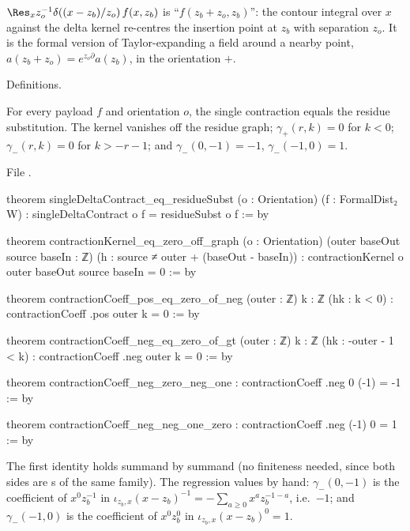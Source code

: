 \begin{physics}
$\Res_x z_o^{-1}\delta((x-z_b)/z_o)\,f(x,z_b)$ is ``$f(z_b+z_o,z_b)$'': the contour integral over $x$ against the delta kernel
re-centres the insertion point at $z_b$ with separation $z_o$. It is the formal version of Taylor-expanding a field
around a nearby point, $a(z_b+z_o) = e^{z_o\partial}a(z_b)$, in the orientation $+$.
\end{physics}

\begin{status}
Definitions.
\end{status}

\begin{proposition}\label{l01:prop:contraction}
For every payload $f$ and orientation $o$, the single contraction equals the residue substitution. The kernel vanishes off
the residue graph; $\gamma_+(r,k) = 0$ for $k<0$; $\gamma_-(r,k) = 0$ for $k>-r-1$; and $\gamma_-(0,-1) = -1$, $\gamma_-(-1,0) = 1$.
\end{proposition}

\noindent File .
\begin{leancode}
theorem singleDeltaContract_eq_residueSubst (o : Orientation) (f : FormalDist₂ W) :
    singleDeltaContract o f = residueSubst o f := by

theorem contractionKernel_eq_zero_off_graph (o : Orientation)
    (outer baseOut source baseIn : ℤ)
    (h : source ≠ outer + (baseOut - baseIn)) :
    contractionKernel o outer baseOut source baseIn = 0 := by

theorem contractionCoeff_pos_eq_zero_of_neg (outer : ℤ) {k : ℤ} (hk : k < 0) :
    contractionCoeff .pos outer k = 0 := by

theorem contractionCoeff_neg_eq_zero_of_gt (outer : ℤ) {k : ℤ}
    (hk : -outer - 1 < k) : contractionCoeff .neg outer k = 0 := by

theorem contractionCoeff_neg_zero_neg_one : contractionCoeff .neg 0 (-1) = -1 := by

theorem contractionCoeff_neg_neg_one_zero : contractionCoeff .neg (-1) 0 = 1 := by
\end{leancode}

\begin{dictionary}
The first identity holds summand by summand (no finiteness needed, since both sides are s of the same family).
The regression values by hand: $\gamma_-(0,-1)$ is the coefficient of $x^{0}z_b^{-1}$ in $\iota_{z_b,x}(x-z_b)^{-1} =
-\sum_{a\ge0}x^az_b^{-1-a}$, i.e.\ $-1$; and $\gamma_-(-1,0)$ is the coefficient of $x^0z_b^0$ in $\iota_{z_b,x}(x-z_b)^{0} = 1$.
\end{dictionary}

